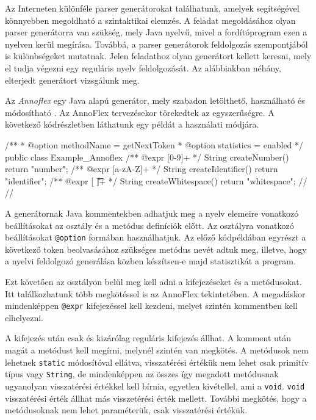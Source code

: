 



Az Interneten különféle parser generátorokat találhatunk, amelyek segítségével könnyebben megoldható a szintaktikai elemzés.
A feladat megoldásához olyan parser generátorra van szükség, mely Java nyelvű, mivel a fordítóprogram ezen a nyelven kerül megírása.
Továbbá, a parser generátorok feldolgozás szempontjából is különbségeket mutatnak.
Jelen feladathoz olyan generátort kellett keresni, mely el tudja végezni egy reguláris nyelv feldolgozását.
Az alábbiakban néhány, elterjedt generátort vizsgálunk meg.


Az \textit{Annoflex} egy Java alapú generátor, mely szabadon letölthető, használható és módosítható \cite{annoflex}.
Az AnnoFlex tervezésekor törekedtek az egyszerűségre. A következő kódrészletben láthatunk egy példát a használati módjára.
\begin{java}
/**
* @option methodName = getNextToken
* @option statistics = enabled
*/
public class Example_Annoflex {
/** @expr [0-9]+       */ String createNumber()     { return "number"; }
/** @expr [a-zA-Z]+    */ String createIdentifier() { return "identifier"; }
/** @expr [ \n\r\t\f]+ */ String createWhitespace() { return "whitespace"; }
//%
//%
}
\end{java}

A generátornak Java kommentekben adhatjuk meg a nyelv elemeire vonatkozó beállításokat az osztály és a metódus definíciók előtt. Az osztályra vonatkozó beállításokat \texttt{@option} formában használhatjuk. Az előző kódpéldában egyrészt a következő token beolvasásához szükséges metódus nevét adtuk meg, illetve, hogy a nyelvi feldolgozó generálása közben készítsen-e majd statisztikát a program.

Ezt követően az osztályon belül meg kell adni a kifejezéseket és a metódusokat. Itt találkozhatunk több megkötéssel is az AnnoFlex tekintetében. A megadáskor mindenképpen \texttt{@expr} kifejezéssel kell kezdeni, melyet szintén kommentben kell elhelyezni.

A kifejezés után csak és kizárólag reguláris kifejezés állhat. A komment után magát a metódust kell megírni, melynél szintén van megkötés. A metódusok nem lehetnek \texttt{static} módosítóval ellátva, visszatérési értékük nem lehet csak primitív típus vagy \texttt{String}, de mindenképpen az összes így megadott metódusnak ugyanolyan visszatérési értékkel kell bírnia, egyetlen kivétellel, ami a \texttt{void}. \texttt{void} visszatérési érték állhat más visszetérési érték mellett. További megkötés, hogy a metódusoknak nem lehet paraméterük, csak visszatérési értékük.

